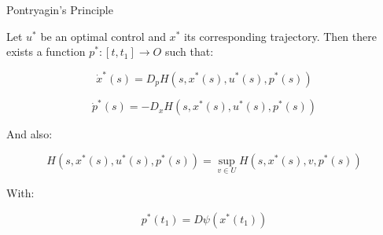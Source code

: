 \documentclass[10pt, compress]{beamer}
\begin{document}
\begin{frame}{Pontryagin's Principle}
    \begin{theorem}\label{1-3-pontry}
    Let $u^{\ast}$ be an optimal control and $x^{\ast}$ its corresponding trajectory. 
    Then there exists a function $p^{\ast}:[t,t_1]\rightarrow O$ such that:

    \begin{equation}\label{1-3-pontry-x}
        \dot{x}^{\ast}(s) = D_p H(s,x^{\ast}(s),u^{\ast}(s),p^{\ast}(s)) 
    \end{equation}

    \begin{equation}\label{1-3-pontry-p}
        \dot{p}^{\ast}(s) =  - D_x H(s,x^{\ast}(s),u^{\ast}(s),p^{\ast}(s)) 
    \end{equation}

    And also:

    \begin{equation}\label{1-3-pontry-maxH}
        H(s,x^{\ast}(s),u^{\ast}(s),p^{\ast}(s)) = \sup_{v\in U} H(s,x^{\ast}(s),v,p^{\ast}(s))
    \end{equation}

    With:

    \begin{equation}\label{1-3-pontry-tras}
        p^{\ast}(t_1) = D \psi(x^{\ast}(t_1))
    \end{equation}
    \end{theorem}
    
\end{frame}
\end{document}
